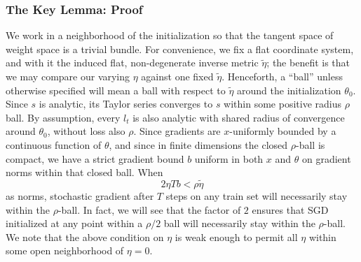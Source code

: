 \documentclass{article}
\begin{document}
        \subsubsection*{The Key Lemma: Proof}
            We work in a neighborhood of the initialization so that the tangent
            space of weight space is a trivial bundle.  For convenience, we fix
            a flat coordinate system, and with it the induced flat,
            non-degenerate inverse metric $\tilde\eta$; the benefit is that we
            may compare our varying $\eta$ against one fixed $\tilde\eta$.
            Henceforth, a ``ball'' unless otherwise specified will mean a ball
            with respect to $\tilde\eta$ around the initialization $\theta_0$.
            Since $s$ is analytic, its Taylor series converges to $s$ within
            some positive radius $\rho$ ball.  By assumption, every $l_t$ is
            also analytic with shared radius of convergence around $\theta_0$,
            without loss also $\rho$.  Since gradients are $x$-uniformly
            bounded by a continuous function of $\theta$, and since in finite
            dimensions the closed $\rho$-ball is compact, we have a strict
            gradient bound $b$ uniform in both $x$ and $\theta$ on gradient
            norms within that closed ball.  When
            \begin{equation} \label{eq:smalleta}
                2 \eta T b < \rho \tilde\eta
            \end{equation}
            as norms, stochastic gradient after $T$ steps on any train set
            will necessarily stay within the $\rho$-ball.  In fact, we will see
            that the factor of $2$ ensures that SGD initialized at any point
            within a $\rho/2$ ball will necessarily stay within the
            $\rho$-ball.  We note that the above condition on $\eta$ is weak
            enough to permit all $\eta$ within some open neighborhood of
            $\eta=0$.  
\end{document}
